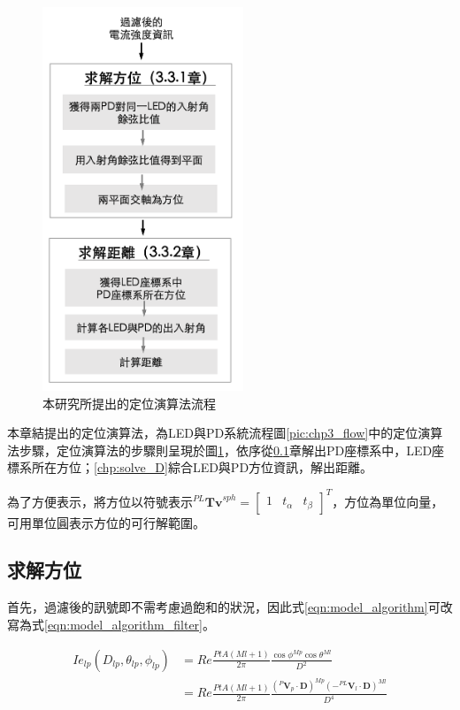 \begin{figure}[h!]
    \centering
    \includegraphics[width=6cm]{ch3pic/algorithm_flow.png}
    \caption{本研究所提出的定位演算法流程}
    \label{pic:algorithm_flow}
\end{figure}

本章結提出的定位演算法，為LED與PD系統流程圖\ref{pic:chp3_flow}中的定位演算法步驟，定位演算法的步驟則呈現於圖\ref{pic:algorithm_flow}，依序從\ref{chp:solve_phi}章解出PD座標系中，LED座標系所在方位；\ref{chp:solve_D}綜合LED與PD方位資訊，解出距離。

為了方便表示，將方位以符號表示$^{PL}\boldsymbol{Tv}^{sph} = \left[\begin{array}{ccc}1&t_{\alpha}&t_{\beta}\end{array}\right]^T$，方位為單位向量，可用單位圓表示方位的可行解範圍。





    \subsection{求解方位}
    \label{chp:solve_phi}

    首先，過濾後的訊號即不需考慮過飽和的狀況，因此式\ref{eqn:model_algorithm}可改寫為式\ref{eqn:model_algorithm_filter}。

    \begin{equation}
        \label{eqn:model_algorithm_filter}
        \begin{aligned}
            Ie_{lp}(D_{lp},\theta_{lp},\phi_{lp}) &= Re\frac{PtA(Ml+1)}{2\pi}\frac{{\cos\phi}^{Mp}{\cos\theta}^{Ml}}{D^2}\\
            & = Re\frac{PtA(Ml+1)}{2\pi}\frac{{(^{P}\boldsymbol{V}_p\cdot\boldsymbol{D})}^{Mp}{(-^{PL}\boldsymbol{V}_l\cdot\boldsymbol{D})}^{Ml}}{D^4}
        \end{aligned}
    \end{equation}

